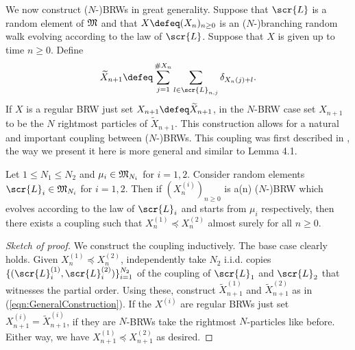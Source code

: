 We now construct ($N$-)BRWs in great generality. Suppose that $\scr{L}$ is a random element of $\frak{M}$ and that $X \defeq (X_n)_{n\geq0}$ is an ($N$-)branching random walk evolving according to the law of $\scr{L}$. Suppose that $X$ is given up to time $n\geq0$. Define 
\begin{equation}\label{eqn:GeneralConstruction}
\widetilde{X}_{n+1} \defeq \sum\limits^{\# X_n}_{j=1} \sum\limits_{l \in \scr{L}_{n, j}} \delta_{X_n(j) +  l}. 
\end{equation}
If $X$ is a regular BRW just set $X_{n+1} \defeq \widetilde{X}_{n+1}$, in the $N$-BRW case set $X_{n+1}$ to be the $N$ rightmost particles of $\widetilde{X}_{n+1}$. This construction allows for a natural and important coupling between ($N$-)BRWs. This coupling was first described in \cite{exptails}, the way we present it here is more general and similar to \cite{mallein2018n} Lemma 4.1.

\begin{lemma}\label{lem:monotonicity}
Let $1 \leq N_1 \leq N_2$ and $\mu_i \in \frak{M}_{N_i}$ for $i = 1,2$. Consider random elements $\scr{L}_i \in \frak{M}_{N_i}$ for $i = 1,2$. Then if $(X^{(i)}_n)_{n\geq0}$ is a(n) ($N$-)BRW which evolves according to the law of $\scr{L}_i$ and starts from $\mu_i$ respectively, then there exists a coupling such that $X^{(1)}_n \preceq X^{(2)}_n$ almost surely for all $n \geq 0$. 
\end{lemma}

\begin{proof}[Sketch of proof]
We construct the coupling inductively. The base case clearly holds. Given $X^{(1)}_n \preceq X^{(2)}_n$, independently take $N_2$ i.i.d. copies $\{(\scr{L}^{(1)}_i, \scr{L}^{(2)}_i)\}^{N_2}_{i=1}$ of the coupling of $\scr{L}_1$ and $\scr{L}_2$ that witnesses the partial order. Using these, construct $\widetilde{X}^{(1)}_{n+1}$ and $\widetilde{X}^{(2)}_{n+1}$ as in (\ref{eqn:GeneralConstruction}). If the $X^{(i)}$ are regular BRWs just set $X^{(i)}_{n+1} = \widetilde{X}^{(i)}_{n+1}$, if they are $N$-BRWs take the rightmost $N$-particles like before. Either way, we have $X^{(1)}_{n+1} \preceq X^{(2)}_{n+1}$ as desired. 
\end{proof}	


